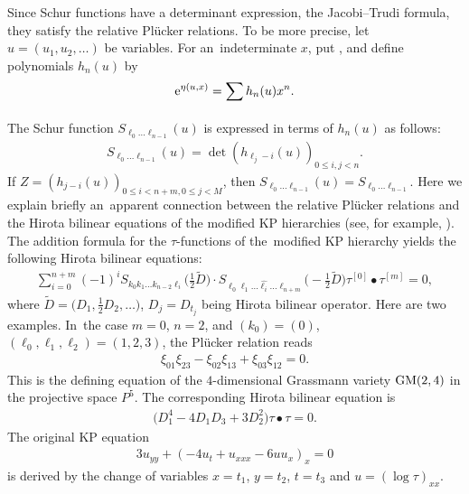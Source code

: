 \documentclass[10pt,a4paper]{amsart}
\numberwithin{equation}{section}
\begin{document}
Since Schur functions have a determinant expression, the Jacobi--Trudi formula, they satisfy the relative Pl\"ucker relations. To be more precise, let $u=(u_1,u_2,\dots)$ be variables. For an~indeterminate $x$, put , and define polynomials $h_n(u)$ by
\begin{gather*}
{\rm e}^{\eta(u,x)}=\sum_{}h_{n}(u)x^n.
\end{gather*}
The Schur function $S_{\ell_0 \dots \ell_{n-1}}(u)$ is expressed in terms of $h_{n}(u)$ as follows:
\begin{gather*}
S_{\ell_0 \dots \ell_{n-1}}(u)=\det{(h_{\ell_{j}-i}(u))}_{0\leq i,j<n}.
\end{gather*}
If $Z=(h_{j-i}(u))_{0\leq i <n+m, 0\leq j < M}$, then $S_{\ell_0 \dots \ell_{n-1}}(u)=S_{\ell_0 \dots \ell_{n-1}}$.
Here we explain briefly an~apparent connection between the relative Pl\"ucker relations and the Hirota bilinear equations of the modified KP hierarchies (see, for example, \cite{ostt}). The addition formula for the $\tau$-functions of the~modified KP hierarchy yields the following Hirota bilinear equations:
\begin{gather*}
\sum_{i=0}^{n+m}{(-1)}^{i}S_{k_0 k_1 \dots k_{n-2} \ell_i}\biggl(\frac{1}{2}\widetilde{D}\biggr)\cdot S_{\ell_0 \ell_1 \dots \widehat{\ell_i} \dots \ell_{n+m}}\biggl(-\frac{1}{2}\widetilde{D}\biggr)\tau^{[0]}\bullet \tau^{[m]}=0,
\end{gather*}
where $\widetilde{D} = \bigl(D_1, \frac{1}{2}D_2, \dots\bigr)$, $D_j = D_{t_j}$ being Hirota bilinear operator.
Here are two examples. In~the case $m=0$, $n=2$, and $(k_0) = (0)$, $(\ell_0,\ell_1, \ell_2)=(1,2,3)$, the Pl\"ucker relation reads
\begin{gather*}
\xi_{01}\xi_{23} - \xi_{02}\xi_{13} + \xi_{03}\xi_{12} = 0.
\end{gather*}
This is the defining equation of the $4$-dimensional Grassmann variety ${\rm GM}(2,4)$ in the projective space $P^5$.
The corresponding Hirota bilinear equation is
\begin{gather*}
\bigl(D_1^4 - 4D_1D_3 + 3D_2^2\bigr)\tau\bullet \tau =0.
\end{gather*}
The original KP equation
\begin{gather*}
3u_{yy} + (-4u_t + u_{xxx} -6uu_x)_x =0
\end{gather*}
is derived by the change of variables $x=t_1$, $y=t_2$, $t=t_3$ and $u=(\log \tau)_{xx}$.
\end{document}

